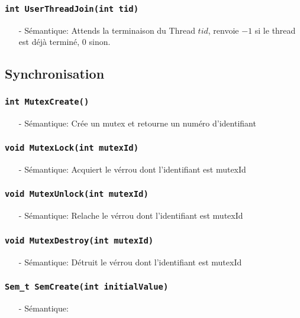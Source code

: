 \documentclass[11pt]{article}
\begin{document}
\subsubsection{\texttt{int UserThreadJoin(int tid)}}
\begin{itemize}
\item[-] Sémantique: Attends la terminaison du Thread $tid$, renvoie $-1$
 si le thread est déjà terminé, $0$ sinon.
\end{itemize}

\subsection{Synchronisation}
\subsubsection{\texttt{int MutexCreate()}}
\begin{itemize}
\item[-]Sémantique: Crée un mutex et retourne un numéro d'identifiant
\end{itemize}

\subsubsection{\texttt{void MutexLock(int mutexId)}}
\begin{itemize}
\item[-]Sémantique: Acquiert le vérrou dont l'identifiant est mutexId
\end{itemize}

\subsubsection{\texttt{void MutexUnlock(int mutexId)}}
\begin{itemize}
\item[-]Sémantique: Relache le vérrou dont l'identifiant est mutexId
\end{itemize}

\subsubsection{\texttt{void MutexDestroy(int mutexId)}}
\begin{itemize}
\item[-]Sémantique: Détruit le vérrou dont l'identifiant est mutexId
\end{itemize}

\subsubsection{\texttt{Sem\_t SemCreate(int initialValue)}}
\begin{itemize}
\item[-]Sémantique: 
\end{itemize}
\end{document}
